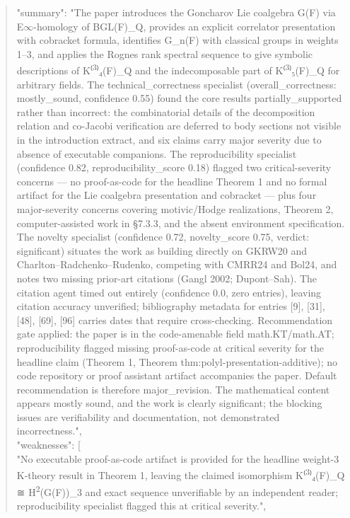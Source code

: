 \documentclass[11pt]{article}
\begin{document}
\begin{quote}
  "summary": "The paper introduces the Goncharov Lie coalgebra G(F) via E\ensuremath{\infty}-homology of BGL(F)\_Q, provides an explicit correlator presentation with cobracket formula, identifies G\_n(F) with classical groups in weights 1--3, and applies the Rognes rank spectral sequence to give symbolic descriptions of K⁽\textsuperscript{3}⁾₄(F)\_Q and the indecomposable part of K⁽\textsuperscript{3}⁾₅(F)\_Q for arbitrary fields. The technical\_correctness specialist (overall\_correctness: mostly\_sound, confidence 0.55) found the core results partially\_supported rather than incorrect: the combinatorial details of the decomposition relation and co-Jacobi verification are deferred to body sections not visible in the introduction extract, and six claims carry major severity due to absence of executable companions. The reproducibility specialist (confidence 0.82, reproducibility\_score 0.18) flagged two critical-severity concerns --- no proof-as-code for the headline Theorem 1 and no formal artifact for the Lie coalgebra presentation and cobracket --- plus four major-severity concerns covering motivic/Hodge realizations, Theorem 2, computer-assisted work in §7.3.3, and the absent environment specification. The novelty specialist (confidence 0.72, novelty\_score 0.75, verdict: significant) situates the work as building directly on GKRW20 and Charlton--Radchenko--Rudenko, competing with CMRR24 and Bol24, and notes two missing prior-art citations (Gangl 2002; Dupont--Sah). The citation agent timed out entirely (confidence 0.0, zero entries), leaving citation accuracy unverified; bibliography metadata for entries [9], [31], [48], [69], [96] carries dates that require cross-checking. Recommendation gate applied: the paper is in the code-amenable field math.KT/math.AT; reproducibility flagged missing proof-as-code at critical severity for the headline claim (Theorem 1, Theorem thm:polyl-presentation-additive); no code repository or proof assistant artifact accompanies the paper. Default recommendation is therefore major\_revision. The mathematical content appears mostly sound, and the work is clearly significant; the blocking issues are verifiability and documentation, not demonstrated incorrectness.",\\
  "weaknesses": [\\
    "No executable proof-as-code artifact is provided for the headline weight-3 K-theory result in Theorem 1, leaving the claimed isomorphism K⁽\textsuperscript{3}⁾₄(F)\_Q ≅ H\textsuperscript{2}(G(F))\_3 and exact sequence unverifiable by an independent reader; reproducibility specialist flagged this at critical severity.",\\

\end{quote}
\end{document}
